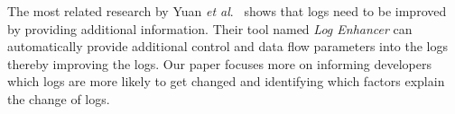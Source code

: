 The most related research by Yuan\textsl{ et al$ . $}~\cite{Yuan} shows that logs need to be improved by providing additional information. Their tool named \emph{Log Enhancer} can automatically provide additional control and data flow parameters into the logs thereby improving the logs. Our paper focuses more on informing developers which logs are more likely to get changed and identifying which factors explain the change of logs. 






